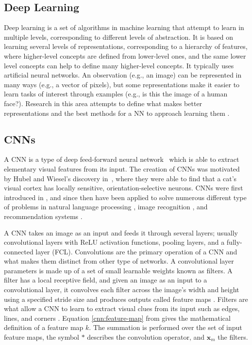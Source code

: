 \subsection{Deep Learning}
Deep learning is a set of algorithms in machine learning that attempt to learn in multiple levels, corresponding to different levels of abstraction. It is based on learning several levels of representations, corresponding to a hierarchy of features, where higher-level concepts are defined from lower-level ones, and the same lower level concepts can help to define many higher-level concepts. It typically uses artificial neural networks. An observation (e.g., an image) can be represented in many ways (e.g., a vector of pixels), but some representations make it easier to learn tasks of interest through examples (e.g., is this the image of a human face?). Research in this area attempts to define what makes better representations and the best methods for a NN to approach learning them \cite{DeepLearning}.

\subsection{CNNs}

A CNN is a type of deep feed-forward neural network~\cite{cnn-star-galaxy} which is able to extract elementary visual features from its input. The creation of CNNs was motivated by Hubel and Wiesel's discovery in~\cite{hubel-wiesel-receptive-fields}, where they were able to find that a cat's visual cortex has locally sensitive, orientation-selective neurons. CNNs were first introduced in \citeyear{Lecun99objectrecognition} \cite{Lecun99objectrecognition}, and since then have been applied to solve numerous different type of problems in  natural language processing \cite{Collobert:2008:UAN:1390156.1390177}, image recognition \cite{cnn-star-galaxy}, and recommendation systems \cite{NIPS2013_5004}.

A CNN takes an image as an input and feeds it through several layers; usually convolutional layers with ReLU activation functions, pooling layers, and a fully-connected layer (FCL). Convolutions are the primary operation of a CNN and what makes them distinct from other type of networks. A convolutional layer parameters is made up of a set of small learnable weights known as filters. A filter has a local receptive field, and given an image as an input to a convolutional layer, it convolves each filter across the image's width and height using a specified stride size and produces outputs called feature maps \cite{cnn-star-galaxy}. Filters are what allow a CNN to learn to extract visual clues from its input such as edges, lines, and corners \cite{Lecun99objectrecognition}. Equation \ref{cnn:feature-map} from \cite{cnn-star-galaxy} gives the mathematical definition of a feature map $k$. The summation is performed over the set of input feature maps, the symbol $*$ describes the convolution operator, and $\boldsymbol{x}_m$ the filters.

